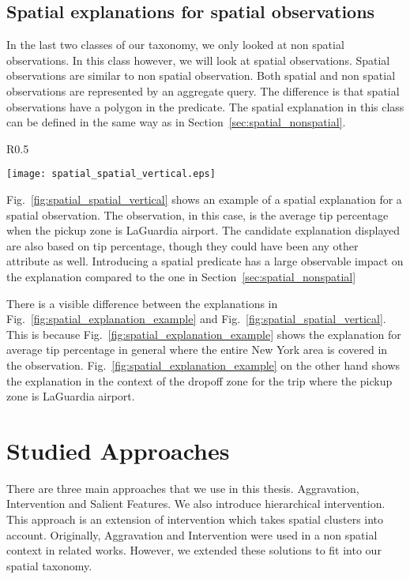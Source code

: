 \subsection{Spatial explanations for spatial observations}
\label{sec:spatial_spatial}
In the last two classes of our taxonomy, we only looked at non spatial observations. In this class however, we will look at spatial observations. Spatial observations are similar to non spatial observation. Both spatial and non spatial observations are represented by an aggregate query. The difference is that spatial observations have a polygon in the predicate. The spatial explanation in this class can be defined in the same way as in Section~\ref{sec:spatial_nonspatial}.

\begin{wrapfigure}{R}{0.5\textwidth}
  \begin{center}
    \texttt{[image: spatial\_spatial\_vertical.eps]}
  \end{center}
  \caption{An example of spatial explanation for a spatial observation}
\label{fig:spatial_spatial_vertical}
\end{wrapfigure}



Fig.~\ref{fig:spatial_spatial_vertical} shows an example of a spatial explanation for a spatial observation. The observation, in this case, is the average tip percentage when the pickup zone is LaGuardia airport. The candidate explanation displayed are also based on tip percentage, though they could have been any other attribute as well. Introducing a spatial predicate has a large observable impact on the explanation compared to the one in Section~\ref{sec:spatial_nonspatial}

There is a visible difference between the explanations in Fig.~\ref{fig:spatial_explanation_example} and Fig.~\ref{fig:spatial_spatial_vertical}. This is because Fig.~\ref{fig:spatial_explanation_example} shows the explanation for average tip percentage in general where the entire New York area is covered in the observation. Fig.~\ref{fig:spatial_explanation_example} on the other hand shows the explanation in the context of the dropoff zone for the trip where the pickup zone is LaGuardia airport.


\section{Studied Approaches}
\label{sec:approaches}
There are three main approaches that we use in this thesis. Aggravation, Intervention and Salient Features. We also introduce hierarchical intervention. This approach is an extension of intervention which takes spatial clusters into account. Originally, Aggravation and Intervention were used in a non spatial context in related works\citep{chirigati2016data}. However, we extended these solutions to fit into our spatial taxonomy.

